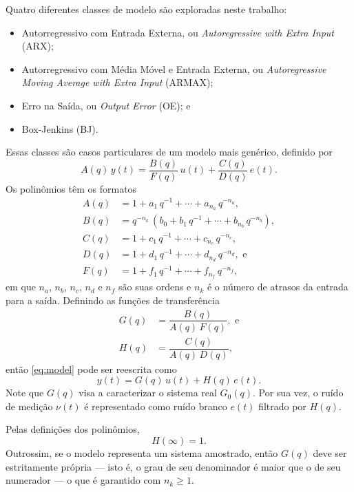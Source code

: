 \documentclass{ppgeesa}
\newcommand{\Prod}{\,}
\begin{document}
Quatro diferentes classes de modelo são exploradas neste trabalho:
\begin{itemize}
  \item Autorregressivo com Entrada Externa, ou \emph{Autoregressive with Extra Input} (ARX);
  \item Autorregressivo com Média Móvel e Entrada Externa, ou \emph{Autoregressive Moving Average with Extra Input} (ARMAX);
  \item Erro na Saída, ou \emph{Output Error} (OE); e
  \item Box-Jenkins (BJ).
\end{itemize}
Essas classes são casos particulares de um modelo mais genérico, definido por
\begin{equation}\label{eq:model}
  A(q) \Prod y(t) = \dfrac{B(q)}{F(q)} \Prod u(t) + \dfrac{C(q)}{D(q)} \Prod e(t)
  .
\end{equation}
Os polinômios têm os formatos
\begin{align}
  A(q) &= 1 + a_1 \Prod q^{-1} + \dotsb + a_{n_a} \Prod q^{-n_a}
  ,
  \\
  B(q) &= q^{-n_k} \Prod \left(b_0 + b_1 \Prod q^{-1} + \dotsb + b_{n_b} \Prod q^{-n_b}\right)
  ,
  \\
  C(q) &= 1 + c_1 \Prod q^{-1} + \dotsb + c_{n_c} \Prod q^{-n_c}
  ,
  \\
  D(q) &= 1 + d_1 \Prod q^{-1} + \dotsb + d_{n_d} \Prod q^{-n_d}
  , \text{ e}
  \\
  F(q) &= 1 + f_1 \Prod q^{-1} + \dotsb + f_{n_f} \Prod q^{-n_f}
  ,
\end{align}
em que $n_a$, $n_b$, $n_c$, $n_d$ e $n_f$ são suas ordens e $n_k$ é o número de atrasos da entrada para a saída.
Definindo as funções de transferência
\begin{align}
  G(q) &= \dfrac{B(q)}{A(q) \Prod F(q)}
  , \text{ e}
  \\
  H(q) &= \dfrac{C(q)}{A(q) \Prod D(q)}
  ,
\end{align}
então \eqref{eq:model} pode ser reescrita como
\begin{equation}\label{eq:model-tf}
  y(t) = G(q) \Prod u(t) + H(q) \Prod e(t)
  .
\end{equation}
Note que $G(q)$ visa a caracterizar o sistema real $G_0(q)$.
Por sua vez, o ruído de medição $\nu(t)$ é representado como ruído branco $e(t)$ filtrado por $H(q)$.

Pelas definições dos polinômios,
\begin{equation}\label{eq:H-inf}
  H(\infty) = 1
  .
\end{equation}
Outrossim, se o modelo representa um sistema amostrado, então $G(q)$ deve ser estritamente própria --- isto é, o grau de seu denominador é maior que o de seu numerador --- o que é garantido com $n_k \geq 1$.
\end{document}
